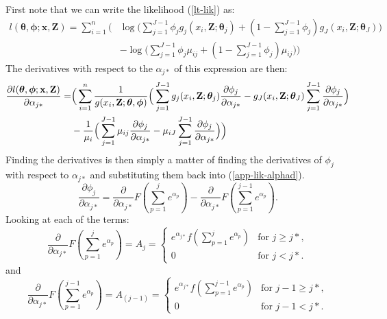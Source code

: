 \documentclass{report}
\begin{document}
First note that we can write the likelihood (\ref{lt-lik}) as:
\begin{align*}
l(\bm{\theta},\bm{\phi}; \mathbf{x},\mathbf{Z}) = \sum_{i=1}^n\Big( &\log \Big( \sum_{j=1}^{J-1} \phi_j g_j(x_i,\mathbf{Z}; \bm{\theta}_j) + (1-\sum_{j=1}^{J-1} \phi_j) g_J(x_i,\mathbf{Z}; \bm{\theta}_J)\Big) \\
&-  \log \Big(\sum_{j=1}^{J-1} \phi_j \mu_{ij} + (1-\sum_{j=1}^{J-1} \phi_j) \mu_{ij} \Big) \Big)
\end{align*}
The derivatives with respect to the $\alpha_{j*}$ of this expression are then:
\begin{align}
\frac{\partial l(\bm{\theta},\bm{\phi}; \mathbf{x},\mathbf{Z})}{\partial \alpha_{j*}} = &\Big( \sum_{i=1}^n \frac{1}{g(x_i,\mathbf{Z}; \bm{\theta},\bm{\phi})} \Big( \sum_{j=1}^{J-1} g_j(x_i,\mathbf{Z}; \bm{\theta}_j) \frac{\partial \phi_j}{\partial \alpha_{j*}}  -g_J(x_i,\mathbf{Z}; \bm{\theta}_J) \sum_{j=1}^{J-1}  \frac{\partial \phi_j}{\partial \alpha_{j*}}\Big) \notag \\
&- \frac{1}{\mu_i} \Big(\sum_{j=1}^{J-1} \mu_{ij} \frac{\partial \phi_j}{\partial \alpha_{j*}} - \mu_{iJ} \sum_{j=1}^{J-1}   \frac{\partial \phi_j}{\partial \alpha_{j*}} \Big)\Big) \label{app-lik-alphad}
\end{align}
Finding the derivatives is then simply a matter of finding the derivatives of $\phi_{j}$ with respect to $\alpha_{j*}$ and substituting them back into (\ref{app-lik-alphad}).
\begin{equation*}
\frac{\partial \phi_j}{\partial \alpha_{j*}} = \frac{\partial}{\partial \alpha_{j*}}F(\sum_{p=1}^j e^{\alpha_p}) - \frac{\partial}{\partial \alpha_{j*}} F(\sum_{p=1}^{j-1} e^{\alpha_p}).
\end{equation*}
Looking at each of the terms:
\begin{equation*}
\frac{\partial}{\partial \alpha_{j*}} F(\sum_{p=1}^j e^{\alpha_p})=A_{j}=\begin{cases}
e^{\alpha_{j*}}f(\sum_{p=1}^j e^{\alpha_p})& \text{for $j\geq j*$},\\
0 & \text{for $j<j*$}.
\end{cases}
\end{equation*}
and
\begin{equation*}
\frac{\partial}{\partial \alpha_{j*}} F(\sum_{p=1}^{j-1} e^{\alpha_p})=A_{(j-1)}=\begin{cases}
e^{\alpha_{j*}}f(\sum_{p=1}^{j-1} e^{\alpha_p})& \text{for $j-1\geq j*$},\\
0 & \text{for $j-1<j*$}.
\end{cases}
\end{equation*}
\end{document}
